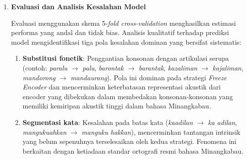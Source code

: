 \begin{enumerate}
\begin{enumerate}
        \item \textbf{Kombinasi Kuat WCE dan \textit{Temporal Separation}}: Penerapan WCE pada fase akhir sukses memangkas WER sebesar 1,68 poin persentase pada \textit{Freeze Encoder} dan 0,99 poin persentase pada LoRA. Puncaknya, saat mekanisme \textit{Temporal Separation} diaktifkan pada Run 10 (L-10), WER turun lebih jauh ke 15,67\% sekaligus memotong standar deviasi menjadi 1,02\% (paling stabil dari seluruh 20 percobaan). Mekanisme ini memastikan bobot WCE dihitung murni dari riwayat masa lalu tanpa mengeksploitasi label validasi saat ini \cite{pineiromartin2024weighted}. Pendekatan historis ini merupakan pengamalan empiris dari prinsip menghindari \textit{covariate shift} milik Sugiyama dkk.\ \cite{sugiyama2007covariate}.

        \item \textbf{Hati-Hati Memanipulasi Data (\textit{Augmentasi})}: Augmentasi yang berlebihan (seperti pada FE-5 dan L-5) secara konsisten menurunkan performa model. Hal ini mengkonfirmasi bahwa pada kondisi dataset yang sangat terbatas, menjaga keseimbangan antara diversifikasi data dan preservasi informasi fonetik asli merupakan hal yang sangat kritis.
    \end{enumerate}

    \item \textbf{Evaluasi dan Analisis Kesalahan Model}

    Evaluasi menggunakan skema 5-\textit{fold cross-validation} menghasilkan estimasi performa yang andal dan tidak bias. Analisis kualitatif terhadap prediksi model mengidentifikasi tiga pola kesalahan dominan yang bersifat sistematis:

    \begin{enumerate}
        \item \textbf{Substitusi fonetik}: Penggantian konsonan dengan artikulasi serupa (contoh: \textit{paralu} $\rightarrow$ \textit{palu}, \textit{barontak} $\rightarrow$ \textit{barantak}, \textit{kazaliman} $\rightarrow$ \textit{kajaliman}, \textit{mandorong} $\rightarrow$ \textit{mandaurang}). Pola ini dominan pada strategi \textit{Freeze Encoder} dan mencerminkan keterbatasan representasi akustik dari encoder yang dibekukan dalam membedakan konsonan-konsonan yang memiliki kemiripan akustik tinggi dalam bahasa Minangkabau.

        \item \textbf{Segmentasi kata}: Kesalahan pada batas kata (\textit{kaadilan} $\rightarrow$ \textit{ka adilan}, \textit{mangukuahkan} $\rightarrow$ \textit{manguku hakkan}), mencerminkan tantangan intrinsik yang belum sepenuhnya terselesaikan oleh kedua strategi. Fenomena ini berkaitan dengan ketiadaan standar ortografi resmi bahasa Minangkabau.


\end{enumerate}
\end{enumerate}

